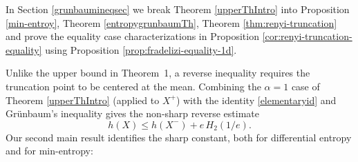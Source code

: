 \documentclass{article}
\theoremstyle{plain}
\newtheorem{corollary}[theorem]{Corollary}
\theoremstyle{definition}
\newcommand{\1}{\mathbf 1}
\begin{document}
In Section \ref{grunbaumineqsec} we break Theorem \ref{upperThIntro} into 
Proposition \ref{min-entroy}, 
Theorem \ref{entropygrunbaumTh},
Theorem \ref{thm:renyi-truncation}
and prove  
the equality case characterizations 
in 
Proposition 
\ref{cor:renyi-truncation-equality} using Proposition \ref{prop:fradelizi-equality-1d}. 




  
Unlike the upper bound in Theorem~1, a reverse inequality requires the truncation point to be centered at the mean. Combining the $\alpha =1$ case of Theorem \ref{upperThIntro} (applied to $X^+$) with the identity \eqref{elementaryid} and Gr\"unbaum's
inequality gives the non-sharp reverse estimate
\[
        h(X)\le h(X^-) + e\,H_2(1/e).
\]
Our second main result identifies the sharp constant, both for
differential entropy and for min-entropy:
\end{document}
